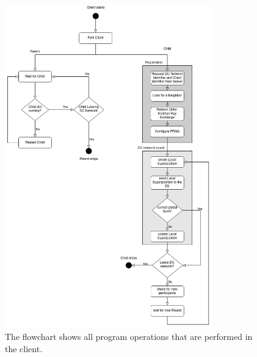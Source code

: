 \begin{figure}[tbp]
  \centering
  \includegraphics[width=0.8\textwidth]{images/Client_structure.png}
  \caption[Flowchart Client Implementatioen]{The flowchart shows all program operations that are performed in the client.}
  \label{fig:Client Implementation}
\end{figure}


